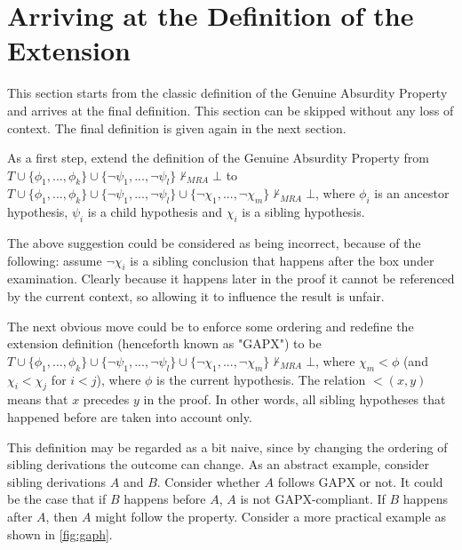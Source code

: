 \documentclass[11pt,twoside,a4paper]{report}
\begin{document}
\section{Arriving at the Definition of the Extension}
This section starts from the classic definition of the Genuine Absurdity Property and arrives at the final definition. This section can be skipped without any loss of context. The final definition is given again in the next section.

As a first step, extend the definition of the Genuine Absurdity Property from $T\cup\{\phi_1, ..., \phi_k\}\cup\{\neg\psi_1, ..., \neg\psi_l\}\nvdash_{MRA}\bot$ to $T\cup\{\phi_1, ..., \phi_k\}\cup\{\neg\psi_1, ..., \neg\psi_l\}\cup\{\neg\chi_1, ..., \neg\chi_m\}\nvdash_{MRA}\bot$, where $\phi_i$ is an ancestor hypothesis, $\psi_i$ is a child hypothesis and $\chi_i$ is a sibling hypothesis.

The above suggestion could be considered as being incorrect, because of the following: assume $\neg\chi_i$ is a sibling conclusion that happens after the box under examination. Clearly because it happens later in the proof it cannot be referenced by the current context, so allowing it to influence the result is unfair.

The next obvious move could be to enforce some ordering and redefine the extension definition (henceforth known as "GAPX") to be $T\cup\{\phi_1, ..., \phi_k\}\cup\{\neg\psi_1, ..., \neg\psi_l\}\cup\{\neg\chi_1, ..., \neg\chi_m\}\nvdash_{MRA}\bot$, where $\chi_m < \phi$ (and $\chi_i < \chi_j$ for $i < j$), where $\phi$ is the current hypothesis. The relation $<(x, y)$ means that $x$ precedes $y$ in the proof. In other words, all sibling hypotheses that happened before are taken into account only.

This definition may be regarded as a bit naive, since by changing the ordering of sibling derivations the outcome can change. As an abstract example, consider sibling derivations $A$ and $B$. Consider whether $A$ follows GAPX or not. It could be the case that if $B$ happens before $A$, $A$ is not GAPX-compliant. If $B$ happens after $A$, then $A$ might follow the property. Consider a more practical example as shown in \autoref{fig:gaph}.
\end{document}
